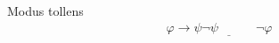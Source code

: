 \begin{ruleinf} \label{relinf_modustollens} Modus tollens
	\begin{equation}
	\begin{gathered}
	    \varphi \to \psi
		\underline {\lnot \psi \quad \quad \quad }
		\lnot \varphi \quad \quad
	\end{gathered}
	\end{equation}
\end{ruleinf}
